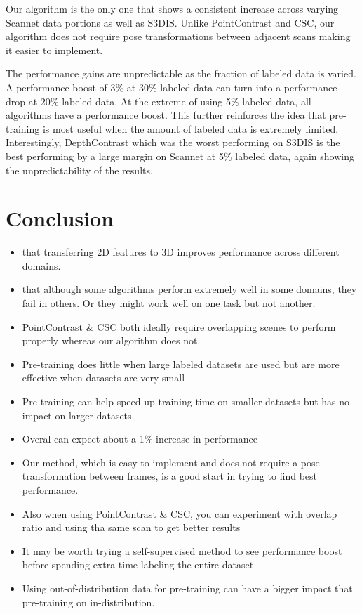 \documentclass[10pt,twocolumn,letterpaper]{article}
\begin{document}
Our algorithm is the only one that shows a consistent increase across varying Scannet data portions as well as S3DIS. Unlike PointContrast and CSC, our algorithm does not require pose transformations between adjacent scans making it easier to implement.

The performance gains are unpredictable as the fraction of labeled data is varied. A performance boost of 3\% at 30\% labeled data can turn into a performance drop at 20\% labeled data. At the extreme of using 5\% labeled data, all algorithms have a performance boost. This further reinforces the idea that pre-training is most useful when the amount of labeled data is extremely limited. Interestingly, DepthContrast which was the worst performing on S3DIS is the best performing by a large margin on Scannet at 5\% labeled data, again showing the unpredictability of the results.

\section{Conclusion}
\label{sec:conclusion}

\begin{itemize}
    \item that transferring 2D features to 3D improves performance across different domains.
    \item that although some algorithms perform extremely well in some domains, they fail in others. Or they might work well on one task but not another.
    \item PointContrast \& CSC both ideally require overlapping scenes to perform properly whereas our algorithm does not.
    \item Pre-training does little when large labeled datasets are used but are more effective when datasets are very small
    \item Pre-training can help speed up training time on smaller datasets but has no impact on larger datasets.
    \item Overal can expect about a 1\% increase in performance
    \item Our method, which is easy to implement and does not require a pose transformation between frames, is a good start in trying to find best performance.
    \item Also when using PointContrast \& CSC, you can experiment with overlap ratio and using tha same scan to get better results
    \item It may be worth trying a self-supervised method to see performance boost before spending extra time labeling the entire dataset
    \item Using out-of-distribution data for pre-training can have a bigger impact that pre-training on in-distribution.
\end{itemize}
\end{document}
